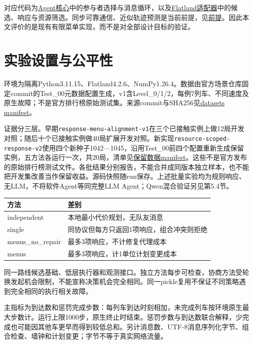 对应代码为\href{../expr/../核心源码/agent.py}{Agent核心}中的参与者选择与消息循环，以及\href{../expr/004-distributed-agent-core/src/flatland_task.py}{Flatland适配器}中的候选、响应与资源筛选。同步可靠通信、近似轨迹预测是当前前提，见\href{../expr/前提.md}{前提}。因此本文评价的是现有有限菜单实现，而不是对全部设计目标的验证。

\hypertarget{ux5b9eux9a8cux8bbeux7f6eux4e0eux516cux5e73ux6027}{%
\chapter{实验设置与公平性}\label{ux5b9eux9a8cux8bbeux7f6eux4e0eux516cux5e73ux6027}}

环境为隔离Python3.11.15、Flatland4.2.6、NumPy1.26.4。数据由官方场景仓库固定commit的Test\_00元数据配置生成，v1含Level\_0/1/2，每例7列车、不同速度及原生故障；不是官方排行榜原始测试集。来源commit与SHA256见\href{../expr/datasets/flatland-core/v1/manifest.json}{datasets
manifest}。

证据分三层。早期\passthrough{\lstinline!response-menu-alignment-v1!}在三个已接触实例上做12局开发对照；随后十个已接触实例做40局扩展开发对照。新实现\passthrough{\lstinline!resource-scoped-response-v2!}使用四个新种子1042---1045，沿用Test\_00前四个配置重新生成保留实例，五方法各运行一次，共20局，清单见\href{../expr/datasets/flatland-core/v3-holdout/manifest.json}{保留数据manifest}。这些不是官方发布的原始排行榜测试文件。各批结果分别报告，不能合并成同版本独立样本，也不能把开发集改善当作保留收益。源码快照随run保存。上述批量实验均为规则响应、无LLM，不将软件Agent等同完整LLM
Agent；Qwen混合验证另见第5.4节。

\begin{longtable}[]{@{}ll@{}}
\toprule
方法 & 差别 \\
\midrule
\endhead
independent & 本地最小代价规划，无队友消息 \\
single & 同协议但每方只返回1项响应，组合冲突则拒绝 \\
menus\_no\_repair & 最多3项响应，不计修复代理成本 \\
menus & 最多3项响应，计1单位计划变更成本 \\
\bottomrule
\end{longtable}

同一路线候选基础、低层执行器和观测接口。独立方法每步可检查，协商方法受轮换发起机会限制，不能宣称决策机会完全相同。同一pickle复用不保证不同策略遇到完全相同的执行相关故障。

主指标为到达数和惩罚完成步数：每列车到达时刻相加，未完成列车按环境原生最大步数计。运行上限1000步，原生终止时结束。惩罚步数与到达数联合解释，少完成也可能因其他车更早而得到较低总和。另计消息数、UTF-8消息序列化字节、组合检查、墙钟和计划变更；字节不等于真实网络流量。

